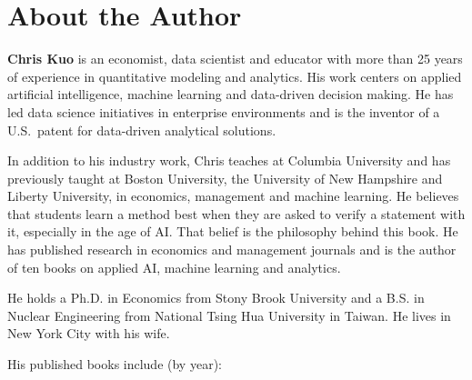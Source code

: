 \chapter*{About the Author}

\textbf{Chris Kuo} is an economist, data scientist and educator with more than 25 years of experience in quantitative modeling and analytics. 
His work centers on applied artificial intelligence, machine learning and data-driven decision making. He has led data science initiatives in enterprise environments
and is the inventor of a U.S.\ patent for data-driven analytical solutions.

In addition to his industry work, Chris teaches at Columbia University and has previously taught at Boston University, the University of New Hampshire and Liberty University, in economics, management and machine learning. He believes that students learn a method best when they are asked to verify a statement with it, especially in the age of AI. That belief is the philosophy behind this book.
He has published research in economics and management journals and is the author of ten books on applied AI, machine learning and analytics.

He holds a Ph.D. in Economics from Stony Brook University and a B.S. in Nuclear Engineering from National Tsing Hua University in Taiwan. He lives in New York City with his wife.

\medskip
\noindent His published books include (by year):


